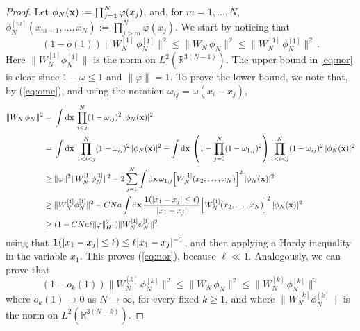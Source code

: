 \documentclass[11pt]{article}
\newcommand{\rd}{{\rm d}}
\newcommand{\bx}{{\bf x}}
\newcommand{\ph}{\varphi}
\newcommand{\bR}{{\mathbb R}}
\begin{document}
\begin{proof}
Let $\phi_N (\bx) := \prod_{j=1}^N \ph (x_j)$, and, for $m=1,
\dots,N$, $\phi_N^{[m]} (x_{m+1}, \dots, x_N) := \prod_{j
>m}^N \ph (x_j)$. We start by noticing that
\begin{equation}\label{eq:nor}
(1-o(1)) \Big\| W_N^{[1]}\,\phi_N^{[1]} \Big\|^2 \leq \Big\| W_N \,
\phi_N \Big\|^2 \leq \Big\| W_N^{[1]}\, \phi_N^{[1]}\Big\|^2\,.
\end{equation}
Here $\| W_N^{[1]} \phi_N^{[1]} \|$ is the norm on
$L^2(\bR^{3(N-1)})$. The upper bound in \eqref{eq:nor} is clear
since $1-\omega \leq 1$ and $\| \ph \|=1$. To prove the lower bound,
we note that, by (\ref{eq:ome}), and using the notation $\omega_{ij}
= \omega (x_i -x_j)$,
\begin{equation*}
\begin{split}
\|W_N \, \phi_N \|^2 = \; &\int \rd \bx \, \prod_{i<j}^N
(1-\omega_{ij})^2 \, |\phi_N (\bx)|^2  \\ = \; &\int \rd \bx \,
\prod_{1<i<j}^N (1-\omega_{ij})^2 \, |\phi_N (\bx)|^2 - \int \rd\bx
\, \left(1 - \prod_{j=2}^N (1-\omega_{1,j})^2 \right)
\prod_{1<i<j}^N (1-\omega_{ij})^2 \, |\phi_N (\bx)|^2 \\
\geq \; & \|\varphi\|^2 \| W_N^{[1]} \phi^{[1]}_N \|^2 -
2\sum_{j=1}^N \int \rd\bx \, \omega_{1,j}
 \Big[ W_N^{[1]} (x_2, \dots , x_N)\Big]^2  \, |\phi_N (\bx)|^2 \\
\geq \; & \| W_N^{[1]} \phi^{[1]}_N \|^2 - C N a
 \int \rd\bx \, \frac{{\bf 1} (|x_1 -x_j| \leq \ell)}{|x_1 -x_j|}
\Big[ W_N^{[1]} (x_2, \dots , x_N)  \Big]^2\, |\phi_N (\bx)|^2 \\
\geq \; & (1 - C N a \ell \| \ph \|_{H^1}^2) \| W_N^{[1]} \phi^{[1]}_N
\|^2
\end{split}
\end{equation*}
using  that ${\bf 1} (|x_1 -x_j| \leq \ell) \leq \ell |x_1
-x_j|^{-1}$, and then applying a Hardy inequality in the variable
$x_1$. This proves (\ref{eq:nor}), because $\ell \ll 1$.
Analogously, we can prove that
\begin{equation}\label{eq:nor-k}
(1-o_k(1)) \Big\| W_N^{[k]}\,\phi_N^{[k]} \Big\|^2 \leq \Big\| W_N
\, \phi_N \Big\|^2 \leq \Big\| W_N^{[k]}\, \phi_N^{[k]}\Big\|^2
\end{equation}
where $o_k(1) \to 0$ as $N\to\infty$, for every fixed $k \geq 1$, and
where $\| W_N^{[k]} \phi_N^{[k]} \|$ is the norm on
$L^2(\bR^{3(N-k)})$.


\end{proof}
\end{document}
